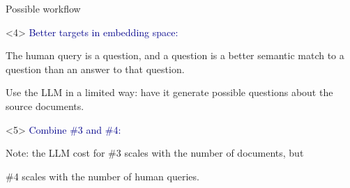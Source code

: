 \documentclass[aspectratio=169]{beamer}
\begin{document}
\begin{frame}{Possible workflow }
\begin{onlyenv}
\vspace{10 cm}
\end{onlyenv}\begin{onlyenv}<4>
\textcolor{darkblue}{Better targets in embedding space:}

\large
\vspace{0.25 cm}
The human query is a question, and a question is a better semantic match to a question than an answer to that question.

\vspace{0.25 cm}
Use the LLM in a limited way: have it generate possible questions about the source documents.

\vspace{10 cm}
\end{onlyenv}\begin{onlyenv}<5>
\textcolor{darkblue}{Combine \#3 and \#4:}

\large
\vspace{0.25 cm}
Note: the LLM cost for \#3 scales with the number of documents, but

\phantom{Note: the LLM cost for }\#4 scales with the number of human queries.
\vspace{10 cm}
\end{onlyenv}
\end{frame}
\end{document}

